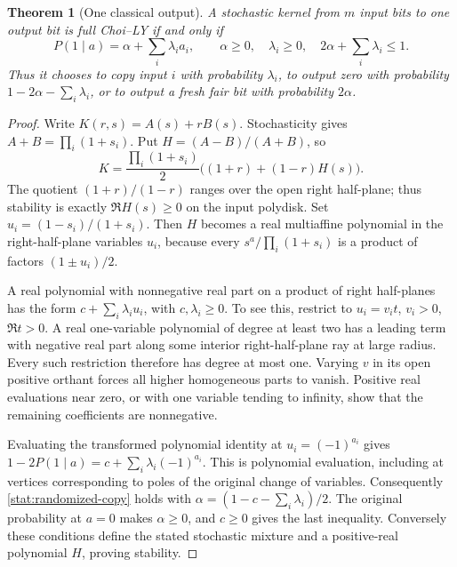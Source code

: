 \documentclass[reqno]{amsart}
\newtheorem{theorem}{Theorem}[section]
\theoremstyle{definition}
\theoremstyle{remark}
\begin{document}
\begin{theorem}[One classical output]
\label{stat:classical-one-output}
A stochastic kernel from \(m\) input bits to one output bit
is full Choi--LY if and only if
\begin{equation}
 P(1\mid a)=\alpha+\sum_i\lambda_i a_i,
 \qquad \alpha\ge0,\quad\lambda_i\ge0,\quad
                   2\alpha+\sum_i\lambda_i\le1.
 \label{stat:randomized-copy}
\end{equation}
Thus it chooses to copy input \(i\) with probability
\(\lambda_i\), to output zero with probability
\(1-2\alpha-\sum_i\lambda_i\), or to output a fresh fair
bit with probability \(2\alpha\).
\end{theorem}

\begin{proof}
Write \(K(r,s)=A(s)+rB(s)\).  Stochasticity gives
\(A+B=\prod_i(1+s_i)\).  Put \(H=(A-B)/(A+B)\), so
\[
 K=\frac{\prod_i(1+s_i)}2\bigl((1+r)+(1-r)H(s)\bigr).
\]
The quotient \((1+r)/(1-r)\) ranges over the open right
half-plane; thus stability is exactly \(\Re H(s)\ge0\)
on the input polydisk.  Set
\(u_i=(1-s_i)/(1+s_i)\).  Then \(H\) becomes a real
multiaffine polynomial in the right-half-plane variables
\(u_i\), because every
\(s^a/\prod_i(1+s_i)\) is a product of factors
\((1\pm u_i)/2\).

A real polynomial with nonnegative real part on a product
of right half-planes has the form
\(c+\sum_i\lambda_i u_i\), with \(c,\lambda_i\ge0\).
To see this, restrict to \(u_i=v_i t\), \(v_i>0\),
\(\Re t>0\).  A real one-variable polynomial of degree
at least two has a leading term with negative real part
along some interior right-half-plane ray at large radius.
Every such restriction therefore has degree at most one.
Varying \(v\) in its open positive orthant forces all
higher homogeneous parts to vanish.  Positive real
evaluations near zero, or with one variable tending to
infinity, show that the remaining coefficients are
nonnegative.

Evaluating the transformed polynomial identity at
\(u_i=(-1)^{a_i}\) gives
\(1-2P(1\mid a)=c+\sum_i\lambda_i(-1)^{a_i}\).
This is polynomial evaluation, including at vertices
corresponding to poles of the original change of variables.
Consequently \eqref{stat:randomized-copy} holds with
\(\alpha=(1-c-\sum_i\lambda_i)/2\).  The original
probability at \(a=0\) makes \(\alpha\ge0\), and
\(c\ge0\) gives the last inequality.  Conversely these
conditions define the stated stochastic mixture and a
positive-real polynomial \(H\), proving stability.
\end{proof}
\end{document}
